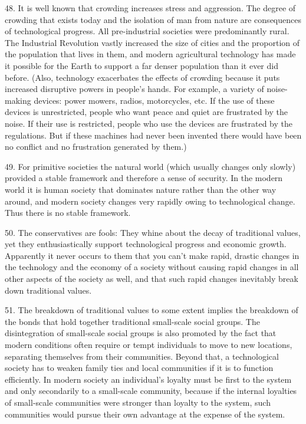 \documentclass{article}
\begin{document}
48. It is well known that crowding increases stress and aggression. The degree of crowding that 
exists today and the isolation of man from nature are consequences of technological progress. All 
pre-industrial societies were predominantly rural. The Industrial Revolution vastly increased the 
size of cities and the proportion of the population that lives in them, and modern agricultural 
technology has made it possible for the Earth to support a far denser population than it ever did 
before. (Also, technology exacerbates the effects of crowding because it puts increased disruptive 
powers in people’s hands. For example, a variety of noise-making devices: power mowers, radios, 
motorcycles, etc. If the use of these devices is unrestricted, people who want peace and quiet are 
frustrated by the noise. If their use is restricted, people who use the devices are frustrated by the 
regulations. But if these machines had never been invented there would have been no conflict and 
no frustration generated by them.) \vspace{\baselineskip}

49. For primitive societies the natural world (which usually changes only slowly) provided a 
stable framework and therefore a sense of security. In the modern world it is human society that 
dominates nature rather than the other way around, and modern society changes very rapidly owing 
to technological change. Thus there is no stable framework. \vspace{\baselineskip}
 
50. The conservatives are fools: They whine about the decay of traditional values, yet they 
enthusiastically support technological progress and economic growth. Apparently it never occurs 
to them that you can’t make rapid, drastic changes in the technology and the economy of a society 
without causing rapid changes in all other aspects of the society as well, and that such rapid 
changes inevitably break down traditional values. \vspace{\baselineskip}

51. The breakdown of traditional values to some extent implies the breakdown of the bonds that 
hold together traditional small-scale social groups. The disintegration of small-scale social groups 
is also promoted by the fact that modern conditions often require or tempt individuals to move to 
new locations, separating themselves from their communities. Beyond that, a technological 
society has to weaken family ties and local communities if it is to function efficiently. In modern 
society an individual’s loyalty must be first to the system and only secondarily to a small-scale 
community, because if the internal loyalties of small-scale communities were stronger than loyalty 
to the system, such communities would pursue their own advantage at the expense of the system. \vspace{\baselineskip}
\end{document}
